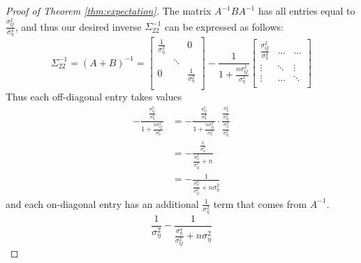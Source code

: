 \begin{proof}[Proof of Theorem \ref{thm:expectation}]
The matrix $A^{-1} B A^{-1}$ has all entries equal to $\frac{\sigma_Q^2}{\sigma_\eta^4}$,
and thus our desired inverse $\Sigma_{22}^{-1}$ 
can be expressed as follows:
%
$$\Sigma_{22}^{-1} = (A+B)^{-1} 
=
\begin{bmatrix}
    \frac{1}{\sigma_\eta^2}  &    &0 \\
     & \ddots &   \\
    0  & & \frac{1}{\sigma_\eta^2}\\
\end{bmatrix}
- 
\frac{1}{
1 + \frac{n \sigma_Q^2}{ \sigma_\eta^2}}
\begin{bmatrix}
    \frac{\sigma_Q^2}{\sigma_\eta^4}  &  \dots & \dots \\
    \vdots & \ddots & \vdots  \\
    \vdots  & \dots & \ddots \\
\end{bmatrix}
$$
%
Thus each off-diagonal entry takes values
\begin{align}
-\frac{\frac{\sigma_Q^2}{\sigma_\eta^4}}{
1 + \frac{n \sigma_Q^2}{ \sigma_\eta^2}} &=
%
%
-\frac{\frac{\sigma_Q^2}{\sigma_\eta^4}}{
1 + \frac{n \sigma_Q^2}{ \sigma_\eta^2}} 
\cdot \frac{\frac{\sigma_\eta^2}{\sigma_Q^2}}
{\frac{\sigma_\eta^2}{\sigma_Q^2}}\\
& = -\frac{\frac{1}{\sigma_\eta^2}}{
\frac{\sigma_\eta^2}{\sigma_Q^2}+ n}\\
& = -\frac{1}{
\frac{\sigma_\eta^4}{\sigma_Q^2}+ n \sigma_\eta^2}
\end{align}
and each on-diagonal entry has an additional $\frac{1}{\sigma_\eta^2}$ term that comes from $A^{-1}$.
\begin{equation}
\frac{1}{\sigma_\eta^2}
- \frac{1}{
\frac{\sigma_\eta^4}{\sigma_Q^2}+ n \sigma_\eta^2}
\end{equation}


\end{proof}
